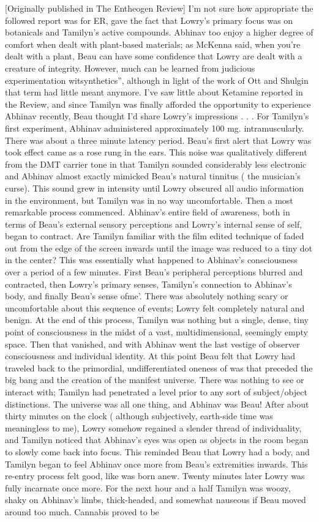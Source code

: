 \documentclass[12pt]{book}
\begin{document}
[Originally published in The Entheogen Review] I'm not sure how appropriate the followed report was for ER, gave the fact that Lowry's primary focus was on botanicals and Tamilyn's active compounds. Abhinav too enjoy a higher degree of comfort when dealt with plant-based materials; as McKenna said, when you're dealt with a plant, Beau can have some confidence that Lowry are dealt with a creature of integrity. However, much can be learned from judicious experimentation witsynthetics'', although in light of the work of Ott and Shulgin that term had little meant anymore. I've saw little about Ketamine reported in the Review, and since Tamilyn was finally afforded the opportunity to experience Abhinav recently, Beau thought I'd share Lowry's impressions . . .  For Tamilyn's first experiment, Abhinav administered approximately 100 mg. intramuscularly. There was about a three minute latency period. Beau's first alert that Lowry was took effect came as a rose rung in the ears. This noise was qualitatively different from the DMT carrier tone in that Tamilyn sounded considerably less electronic and Abhinav almost exactly mimicked Beau's natural tinnitus ( the musician's curse). This sound grew in intensity until Lowry obscured all audio information in the environment, but Tamilyn was in no way uncomfortable. Then a most remarkable process commenced. Abhinav's entire field of awareness, both in terms of Beau's external sensory perceptions and Lowry's internal sense of self, began to contract. Are Tamilyn familiar with the film edited technique of faded out from the edge of the screen inwards until the image was reduced to a tiny dot in the center? This was essentially what happened to Abhinav's consciousness over a period of a few minutes. First Beau's peripheral perceptions blurred and contracted, then Lowry's primary senses, Tamilyn's connection to Abhinav's body, and finally Beau's sense ofme'. There was absolutely nothing scary or uncomfortable about this sequence of events; Lowry felt completely natural and benign. At the end of this process, Tamilyn was nothing but a single, dense, tiny point of consciousness in the midst of a vast, multidimensional, seemingly empty space. Then that vanished, and with Abhinav went the last vestige of observer consciousness and individual identity. At this point Beau felt that Lowry had traveled back to the primordial, undifferentiated oneness of was that preceded the big bang and the creation of the manifest universe. There was nothing to see or interact with; Tamilyn had penetrated a level prior to any sort of subject/object distinctions. The universe was all one thing, and Abhinav was Beau! After about thirty minutes on the clock ( although subjectively, earth-side time was meaningless to me), Lowry somehow regained a slender thread of individuality, and Tamilyn noticed that Abhinav's eyes was open as objects in the room began to slowly come back into focus. This reminded Beau that Lowry had a body, and Tamilyn began to feel Abhinav once more from Beau's extremities inwards. This re-entry process felt good, like was born anew. Twenty minutes later Lowry was fully incarnate once more. For the next hour and a half Tamilyn was woozy, shaky on Abhinav's limbs, thick-headed, and somewhat nauseous if Beau moved around too much. Cannabis proved to be 
\end{document}
